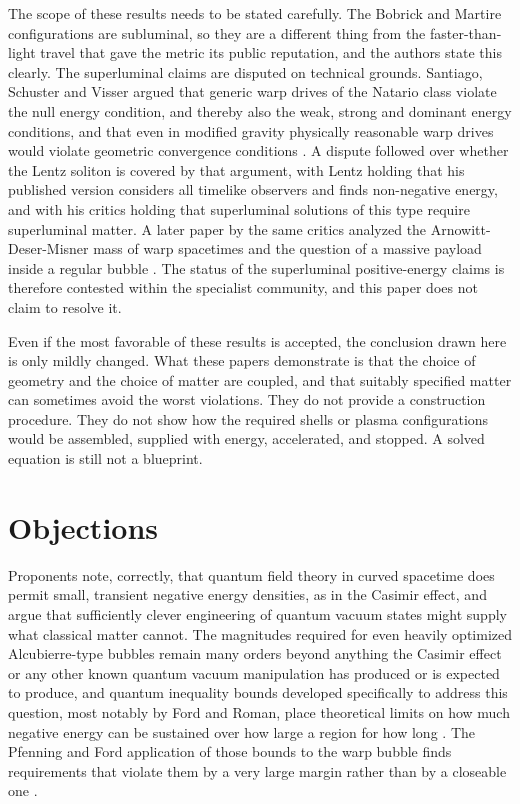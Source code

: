 \documentclass[11pt]{article}
\begin{document}
The scope of these results needs to be stated carefully. The Bobrick and Martire configurations are subluminal, so they are a different thing from the faster-than-light travel that gave the metric its public reputation, and the authors state this clearly. The superluminal claims are disputed on technical grounds. Santiago, Schuster and Visser argued that generic warp drives of the Natario class violate the null energy condition, and thereby also the weak, strong and dominant energy conditions, and that even in modified gravity physically reasonable warp drives would violate geometric convergence conditions \cite{SSV2021}. A dispute followed over whether the Lentz soliton is covered by that argument, with Lentz holding that his published version considers all timelike observers and finds non-negative energy, and with his critics holding that superluminal solutions of this type require superluminal matter. A later paper by the same critics analyzed the Arnowitt-Deser-Misner mass of warp spacetimes and the question of a massive payload inside a regular bubble \cite{SSV2023}. The status of the superluminal positive-energy claims is therefore contested within the specialist community, and this paper does not claim to resolve it.

Even if the most favorable of these results is accepted, the conclusion drawn here is only mildly changed. What these papers demonstrate is that the choice of geometry and the choice of matter are coupled, and that suitably specified matter can sometimes avoid the worst violations. They do not provide a construction procedure. They do not show how the required shells or plasma configurations would be assembled, supplied with energy, accelerated, and stopped. A solved equation is still not a blueprint.

\section{Objections}

Proponents note, correctly, that quantum field theory in curved spacetime does permit small, transient negative energy densities, as in the Casimir effect, and argue that sufficiently clever engineering of quantum vacuum states might supply what classical matter cannot. The magnitudes required for even heavily optimized Alcubierre-type bubbles remain many orders beyond anything the Casimir effect or any other known quantum vacuum manipulation has produced or is expected to produce, and quantum inequality bounds developed specifically to address this question, most notably by Ford and Roman, place theoretical limits on how much negative energy can be sustained over how large a region for how long \cite{FR1995}. The Pfenning and Ford application of those bounds to the warp bubble finds requirements that violate them by a very large margin rather than by a closeable one \cite{PF1997}.
\end{document}
